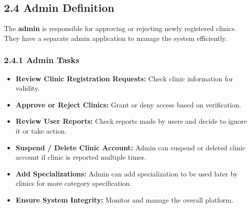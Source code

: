 \documentclass[12pt]{report}
\begin{document}
\vspace{0.5cm}


\subsection*{\textbf{2.4 Admin Definition}}

\noindent The \textbf{admin} is responsible for approving or rejecting newly registered clinics. They have a separate admin application to manage the system efficiently.

\subsubsection*{\textbf{2.4.1 Admin Tasks}}
\begin{itemize}
	\item \textbf{Review Clinic Registration Requests:} Check clinic information for validity.
	\item \textbf{Approve or Reject Clinics:} Grant or deny access based on verification.
	\item \textbf{Review User Reports:} Check reports made by users and decide to ignore it or take action.
	\item \textbf{Suspend / Delete Clinic Account:} Admin can suspend or deleted clinic account if clinic is reported multiple times.
	\item \textbf{Add Specializations:} Admin can add specialization to be used later by clinics for more category specification.
	\item \textbf{Ensure System Integrity:} Monitor and manage the overall platform.
\end{itemize}
\end{document}
